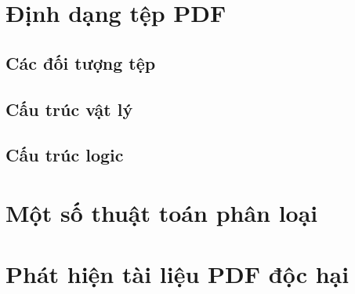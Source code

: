 \documentclass[./../main.tex]{subfiles}
\begin{document}
\section{Định dạng tệp PDF}
\subsection{Các đối tượng tệp}
\subsection{Cấu trúc vật lý}
\subsection{Cấu trúc logic}

\section{Một số thuật toán phân loại}

\section{Phát hiện tài liệu PDF độc hại}
\end{document}

